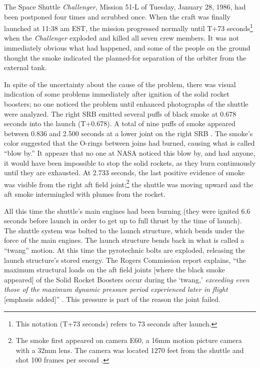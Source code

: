 The Space Shuttle {\em Challenger}, Mission 51-L of Tuesday, January 28, 1986, had been postponed four times and scrubbed once. When the craft was finally launched at 11:38 am EST, the mission progressed normally until T+73 seconds\footnote{This notation (T+73 seconds) refers to 73 seconds after launch.} when the {\em Challenger} exploded and killed all seven crew members. It was not immediately obvious what had happened, and some of the people on the ground thought the smoke indicated the planned-for separation of the orbiter from the external tank.

In spite of the uncertainty about the cause of the problem, there was visual indication of some problems immediately after ignition of the solid rocket boosters; no one noticed the problem until enhanced photographs of the shuttle were analyzed. The right SRB emitted several puffs of black smoke at 0.678 seconds into the launch (T+0.678). A total of nine puffs of smoke appeared between 0.836 and 2.500 seconds at a lower joint on the right SRB \cite[vol. 1, p. 19]{rogers}. The smoke's color suggested that the O-rings between joins had burned, causing what is called ``blow by.'' It appears that no one at NASA noticed this blow by, and had anyone, it would have been impossible to stop the solid rockets, as they burn continuously until they are exhausted. At 2.733 seconds, the last positive evidence of smoke was visible from the right aft field joint;\footnote{The smoke first appeared on camera E60, a 16mm motion picture camera with a 32mm lens. The camera was located 1270 feet from the shuttle and shot 100 frames per second \cite[vol. 3, p. N-9]{rogers}.} the shuttle was moving upward and the aft smoke intermingled with plumes from the rocket.

All this time the shuttle's main engines had been burning (they were ignited 6.6 seconds before launch in order to get up to full thrust by the time of launch). The shuttle system was bolted to the launch structure, which bends under the force of the main engines. The launch structure bends back in what is called a ``twang'' motion. At this time the pyrotechnic bolts are exploded, releasing the launch structure's stored energy. The Rogers Commission report explains, ``the maximum structural loads on the aft field joints [where the black smoke appeared] of the Solid Rocket Boosters occur during the `twang,' {\em exceeding even those of the maximum dynamic pressure period experienced later in flight} [emphasis added]'' \cite[p. 19]{rogers}. This pressure is part of the reason the joint failed.

